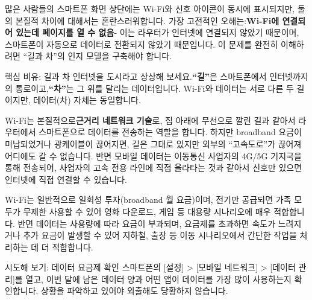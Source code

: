 


많은 사람들의 스마트폰 화면 상단에는 Wi-Fi와 신호 아이콘이 동시에 표시되지만, 둘의 본질적 차이에 대해서는 혼란스러워합니다. 가장 고전적인 오해는:\textbf{Wi-Fi에 연결되어 있는데 페이지를 열 수 없음}- 이는 라우터가 인터넷에 연결되지 않았기 때문이며, 스마트폰이 자동으로 데이터로 전환되지 않았기 때문입니다. 이 문제를 완전히 이해하려면 “길과 차”의 인지 모델을 구축해야 합니다.

\begin{tcbinfo}{핵심 비유: 길과 차}
인터넷을 도시라고 상상해 보세요.\textbf{“길”}은 스마트폰에서 인터넷까지의 통로이고,\textbf{“차”}는 그 위를 달리는 데이터입니다. Wi-Fi와 데이터는 서로 다른 두 길이지만, 데이터(차) 자체는 동일합니다.

\end{tcbinfo}


Wi-Fi는 본질적으로\textbf{근거리 네트워크 기술}로, 집 아래에 무선으로 깔린 길과 같아서 라우터에서 스마트폰으로 데이터를 전송하는 역할을 합니다. 하지만 broadband 요금이 미납되었거나 광케이블이 끊어지면, 길은 그대로 있지만 외부의 “고속도로”가 끊어져 어디에도 갈 수 없습니다. 반면 모바일 데이터는 이동통신 사업자의 4G/5G 기지국을 통해 전송되어, 사업자의 고속 전용 라인에 직접 올라타는 것과 같아서 신호만 있으면 인터넷에 직접 연결할 수 있습니다.


Wi-Fi는 일반적으로 일회성 투자(broadband 월 요금)이며, 전기만 공급되면 가족 모두가 무제한 사용할 수 있어 영화 다운로드, 게임 등 대용량 시나리오에 매우 적합합니다. 반면 데이터는 사용량에 따라 요금이 부과되며, 요금제를 초과하면 속도가 느려지거나 추가 요금이 발생할 수 있어 지하철, 출장 등 이동 시나리오에서 간단한 작업을 처리하는 데 더 적합합니다.

\begin{tcbpractice}{시도해 보기: 데이터 요금제 확인}
스마트폰의 [설정] > [모바일 네트워크] > [데이터 관리]를 열고, 이번 달에 남은 데이터 양과 어떤 앱이 데이터를 가장 많이 사용하는지 확인합니다. 상황을 파악하고 있어야 외출해도 당황하지 않습니다.

\end{tcbpractice}

